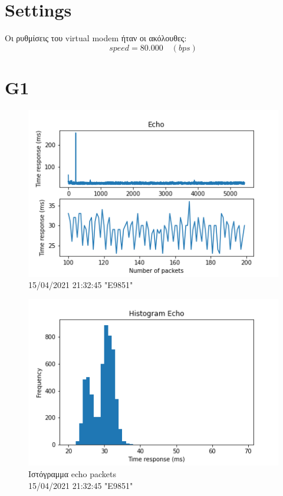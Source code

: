 \documentclass[hidelinks, 12pt, a4paper]{article}
\begin{document}



\pagebreak
{
\renewcommand*\contentsname{Περιεχόμενα}
\hypersetup{linkcolor=black}
\tableofcontents
}
\pagebreak


\section{Settings}

Οι ρυθμίσεις του virtual modem ήταν οι ακόλουθες:
\[speed = 80.000 \quad (bps)\]

\section{G1}

\begin{figure}[h!]
\centering
	\includegraphics[keepaspectratio, width=.7\textwidth]{echo.png}
	\caption{15/04/2021 21:32:45 "E9851"} 
\end{figure}

\begin{figure}[h!]
\centering
	\includegraphics[keepaspectratio, width=.7\textwidth]{hist_echo.png}
	\caption{Ιστόγραμμα echo packets \\ 15/04/2021 21:32:45 "E9851"} 
\end{figure}
\end{document}
